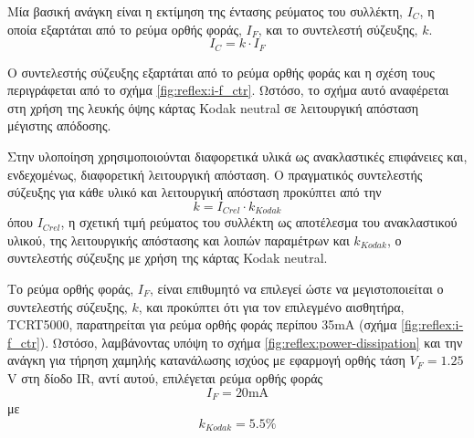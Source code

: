 Μία βασική ανάγκη είναι η εκτίμηση της έντασης ρεύματος του συλλέκτη, ${I_C}$, η
οποία εξαρτάται από το ρεύμα ορθής φοράς, $I_F$, και το συντελεστή σύζευξης,
$k$.
\begin{equation}
I_C = k \cdot I_F \label{eq:reflex:i-c}
\end{equation}

Ο συντελεστής σύζευξης εξαρτάται από το ρεύμα ορθής φοράς και η σχέση τους
περιγράφεται από το σχήμα \ref{fig:reflex:i-f_ctr}. Ωστόσο, το σχήμα αυτό
αναφέρεται στη χρήση της
λευκής όψης κάρτας Kodak neutral σε λειτουργική απόσταση μέγιστης απόδοσης.

Στην υλοποίηση χρησιμοποιούνται διαφορετικά υλικά ως ανακλαστικές επιφάνειες
και, ενδεχομένως, διαφορετική λειτουργική απόσταση. Ο πραγματικός συντελεστής
σύζευξης για κάθε υλικό και λειτουργική απόσταση προκύπτει από την
\begin{equation}
k = I_{Crel} \cdot k_{Kodak} \label{eq:reflex:k}
\end{equation}
όπου $I_{Crel}$, η σχετική τιμή ρεύματος του συλλέκτη ως αποτέλεσμα του
ανακλαστικού υλικού, της λειτουργικής απόστασης και λοιπών παραμέτρων και
$k_{Kodak}$, ο συντελεστής σύζευξης με χρήση της κάρτας Kodak neutral.


Το ρεύμα ορθής φοράς, $I_F$, είναι επιθυμητό να επιλεγεί ώστε να μεγιστοποιείται
ο συντελεστής σύζευξης, $k$, και προκύπτει ότι για τον επιλεγμένο αισθητήρα,
TCRT5000, παρατηρείται για ρεύμα ορθής φοράς περίπου 35mA (σχήμα
\ref{fig:reflex:i-f_ctr}).
Ωστόσο, λαμβάνοντας υπόψη το σχήμα \ref{fig:reflex:power-dissipation} και την
ανάγκη για τήρηση χαμηλής κατανάλωσης ισχύος με εφαρμογή ορθής τάση
$V_F = 1.25$V στη δίοδο IR, αντί αυτού, επιλέγεται ρεύμα ορθής φοράς
\begin{equation}
I_F = 20\text{mA} \label{eq:reflex:i-f_value}
\end{equation}
με
\begin{equation}
k_{Kodak} = 5.5\% \label{eq:reflex:k_kodak-value}
\end{equation}


